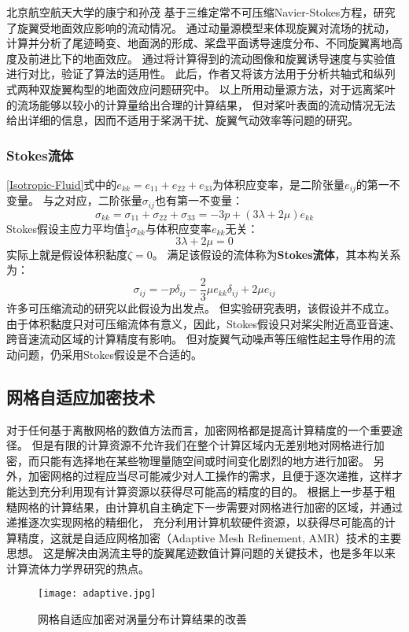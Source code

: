 \documentclass[doctor,openright,twoside,color]{buaathesis}
\begin{document}
北京航空航天大学的康宁和孙茂
基于三维定常不可压缩Navier-Stokes方程，研究了旋翼受地面效应影响的流动情况。
通过动量源模型来体现旋翼对流场的扰动，计算并分析了尾迹畸变、地面涡的形成、桨盘平面诱导速度分布、不同旋翼离地高度及前进比下的地面效应。
通过将计算得到的流动图像和旋翼诱导速度与实验值进行对比，验证了算法的适用性。
此后，作者又将该方法用于分析共轴式和纵列式两种双旋翼构型的地面效应问题研究中。
以上所用动量源方法，对于远离桨叶的流场能够以较小的计算量给出合理的计算结果，
但对桨叶表面的流动情况无法给出详细的信息，因而不适用于桨涡干扰、旋翼气动效率等问题的研究。

\subsubsection{Stokes流体}
\ref{Isotropic-Fluid}式中的$e_{kk}=e_{11}+e_{22}+e_{33}$为体积应变率，是二阶张量$e_{ij}$的第一不变量。
与之对应，二阶张量$\sigma_{ij}$也有第一不变量：
\begin{equation}\label{}
\sigma_{kk}
=
\sigma_{11}+\sigma_{22}+\sigma_{33}
=
-3p
+\left( 3\lambda + 2\mu \right) e_{kk}
\end{equation}
Stokes假设主应力平均值$\frac{1}{3}\sigma_{kk}$与体积应变率$e_{kk}$无关：
\begin{equation}\label{}
3\lambda + 2\mu = 0
\end{equation}
实际上就是假设体积黏度$\zeta = 0$。
满足该假设的流体称为\textbf{Stokes流体}，其本构关系为：
\begin{equation}\label{Stokes-Fluid}
\sigma_{ij}
=
-p\delta_{ij}
-\frac{2}{3}\mu  e_{kk} \delta_{ij}
+2\mu  e_{ij}
\end{equation}
许多可压缩流动的研究以此假设为出发点。
但实验研究表明，该假设并不成立。
由于体积黏度只对可压缩流体有意义，因此，Stokes假设只对桨尖附近高亚音速、跨音速流动区域的计算精度有影响。
但对旋翼气动噪声等压缩性起主导作用的流动问题，仍采用Stokes假设是不合适的。

\subsection{网格自适应加密技术}
对于任何基于离散网格的数值方法而言，加密网格都是提高计算精度的一个重要途径。
但是有限的计算资源不允许我们在整个计算区域内无差别地对网格进行加密，而只能有选择地在某些物理量随空间或时间变化剧烈的地方进行加密。
另外，加密网格的过程应当尽可能减少对人工操作的需求，且便于逐次递推，这样才能达到充分利用现有计算资源以获得尽可能高的精度的目的。
根据上一步基于粗糙网格的计算结果，由计算机自主确定下一步需要对网格进行加密的区域，并通过递推逐次实现网格的精细化，
充分利用计算机软硬件资源，以获得尽可能高的计算精度，这就是自适应网格加密（Adaptive Mesh Refinement, AMR）技术的主要思想。
这是解决由涡流主导的旋翼尾迹数值计算问题的关键技术，也是多年以来计算流体力学界研究的热点。
\begin{figure}[t!]
    \centering
    \texttt{[image: adaptive.jpg]}
    \caption{网格自适应加密对涡量分布计算结果的改善}
\end{figure}
\end{document}
